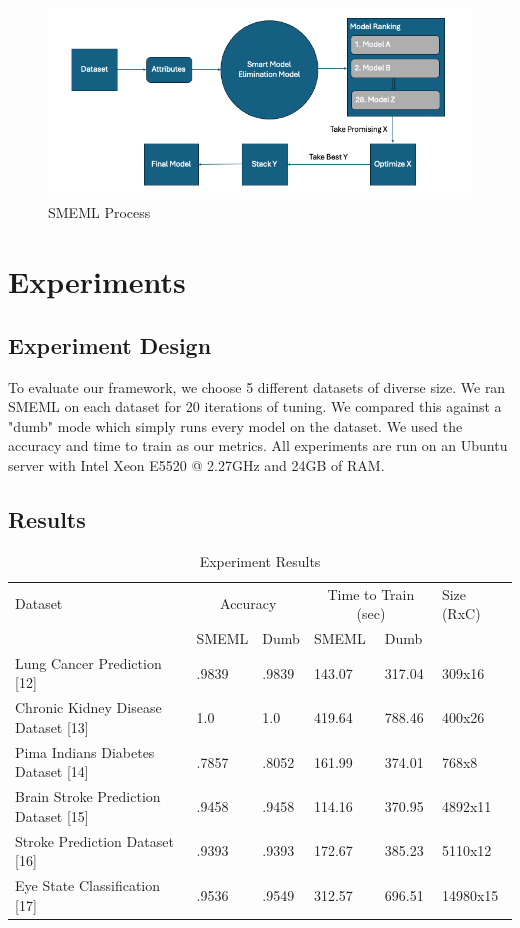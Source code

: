 \documentclass{article}
\begin{document}
\begin {figure}
\centering
\includegraphics[width=\textwidth]{smeml-flowchart.png}
\caption{SMEML Process}
\end{figure}

\section{Experiments}
\subsection{Experiment Design}
To evaluate our framework, we choose 5 different datasets of diverse size. We ran SMEML on each dataset for 20 iterations of tuning. We compared this against a "dumb" mode which simply runs every model on the dataset. We used the accuracy and time to train as our metrics. All experiments are run on an Ubuntu server with Intel Xeon E5520 @ 2.27GHz and 24GB of RAM.

\subsection{Results}
\begin{table}
  \caption{Experiment Results}
  \label{model-options-table}
  \centering
  \begin{tabular}{llllll}
    \toprule
    Dataset & \multicolumn{2}{c}{Accuracy} & \multicolumn{2}{c}{Time to Train (sec)} & Size (RxC)\\
    \cmidrule(lr){2-3} \cmidrule(lr){4-5}
    & SMEML & Dumb & SMEML & Dumb \\
    \midrule
    Lung Cancer Prediction [12] & .9839 & .9839 & 143.07 & 317.04 & 309x16\\
    Chronic Kidney Disease Dataset [13] & 1.0 & 1.0 & 419.64 & 788.46 & 400x26\\
    Pima Indians Diabetes Dataset [14] & .7857 & .8052 & 161.99 & 374.01 & 768x8 \\
    Brain Stroke Prediction Dataset [15] & .9458 & .9458 & 114.16 & 370.95 & 4892x11\\
    Stroke Prediction Dataset [16] & .9393 & .9393 & 172.67 & 385.23 & 5110x12 \\
    Eye State Classification [17] & .9536 & .9549 & 312.57 & 696.51 & 14980x15\\ 
    \bottomrule
  \end{tabular}
\end{table}
\end{document}
